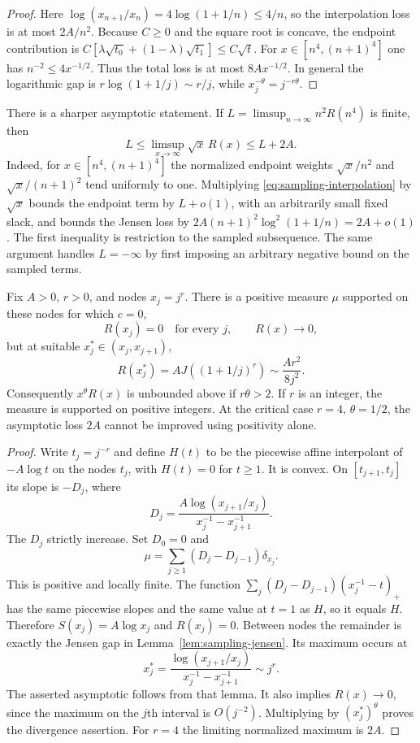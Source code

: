 \begin{proof}
Here $\log(x_{n+1}/x_n)=4\log(1+1/n)\le4/n$, so the interpolation
loss is at most $2A/n^2$. Because $C\ge0$ and the square root is
concave, the endpoint contribution is
$C[\lambda\sqrt{t_0}+(1-\lambda)\sqrt{t_1}]\le C\sqrt t$.
For $x\in[n^4,(n+1)^4]$ one has $n^{-2}\le4x^{-1/2}$.
Thus the total loss is at most $8Ax^{-1/2}$. In general the logarithmic gap is
$r\log(1+1/j)\sim r/j$, while $x_j^{-\theta}=j^{-r\theta}$.
\end{proof}

There is a sharper asymptotic statement. If
$L=\limsup_{n\to\infty}n^2R(n^4)$ is finite, then
\[
 L\le\limsup_{x\to\infty}\sqrt x\,R(x)\le L+2A.
\]
Indeed, for $x\in[n^4,(n+1)^4]$ the normalized endpoint weights
$\sqrt x/n^2$ and $\sqrt x/(n+1)^2$ tend uniformly to one.
Multiplying \eqref{eq:sampling-interpolation} by $\sqrt x$ bounds the
endpoint term by $L+o(1)$, with an arbitrarily small fixed slack,
and bounds the Jensen loss by
$2A(n+1)^2\log^2(1+1/n)=2A+o(1)$. The first inequality is restriction
to the sampled subsequence. The same argument handles $L=-\infty$
by first imposing an arbitrary negative bound on the sampled terms.

\begin{proposition}\label{prop:sampling-sharp}
Fix $A>0$, $r>0$, and nodes $x_j=j^r$. There is a positive measure
$\mu$ supported on these nodes for which $c=0$,
\[
 R(x_j)=0\quad\text{for every }j,\qquad R(x)\longrightarrow0,
\]
but at suitable $x_j^*\in(x_j,x_{j+1})$,
\[
 R(x_j^*)=A J((1+1/j)^r)\sim\frac{Ar^2}{8j^2}.
\]
Consequently $x^{\theta}R(x)$ is unbounded above if $r\theta>2$.
If $r$ is an integer, the measure is supported on positive integers.
At the critical case $r=4$, $\theta=1/2$, the asymptotic loss $2A$
cannot be improved using positivity alone.
\end{proposition}

\begin{proof}
Write $t_j=j^{-r}$ and define $H(t)$ to be the piecewise affine
interpolant of $-A\log t$ on the nodes $t_j$, with $H(t)=0$ for
$t\ge1$. It is convex. On $[t_{j+1},t_j]$ its slope is $-D_j$, where
\[
 D_j=\frac{A\log(x_{j+1}/x_j)}{x_j^{-1}-x_{j+1}^{-1}}.
\]
The $D_j$ strictly increase. Set $D_0=0$ and
\[
 \mu=\sum_{j\ge1}(D_j-D_{j-1})\delta_{x_j}.
\]
This is positive and locally finite. The function
$\sum_j(D_j-D_{j-1})(x_j^{-1}-t)_+$ has the same piecewise slopes
and the same value at $t=1$ as $H$, so it equals $H$.
Therefore $S(x_j)=A\log x_j$ and $R(x_j)=0$.
Between nodes the remainder is exactly the Jensen gap in
Lemma~\ref{lem:sampling-jensen}. Its maximum occurs at
\[
 x_j^*=\frac{\log(x_{j+1}/x_j)}{x_j^{-1}-x_{j+1}^{-1}}
       \sim j^r.
\]
The asserted asymptotic follows from that lemma. It also implies
$R(x)\to0$, since the maximum on the $j$th interval is $O(j^{-2})$.
Multiplying by $(x_j^*)^{\theta}$ proves the divergence assertion.
For $r=4$ the limiting normalized maximum is $2A$.
\end{proof}

